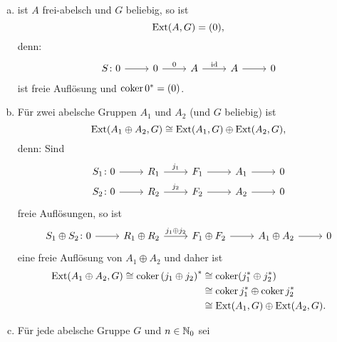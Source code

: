 \begin{beispiel}
  \begin{enumerate}[(a)]
    \item
      ist $A$ frei-abelsch und $G$ beliebig, so ist
      \begin{equation*}
        \mathrm{Ext}(A,G) = (0),
      \end{equation*}
      denn:
      \begin{equation*}
        \begin{tikzcd}
          S\colon 0 \arrow{r}{}  & 0 \arrow{r}{0}  & A \arrow{r}{\id}  & A \arrow{r}{} & 0
        \end{tikzcd}
      \end{equation*}
      ist freie Auflösung und $\operatorname{coker} 0^* = (0)$.
    \item
      Für zwei abelsche Gruppen $A_1$ und $A_2$ (und $G$ beliebig) ist
      \begin{equation*}
        \mathrm{Ext}(A_1 \oplus A_2,G) \cong \mathrm{Ext}(A_1,G) \oplus \mathrm{Ext}(A_2,G),
      \end{equation*}
      denn: Sind
      \begin{equation*}
        \begin{tikzcd}[row sep=tiny]
          S_1\colon 0 \arrow{r}{}  & R_1 \arrow{r}{j_1}  & F_1 \arrow{r}{}  & A_1 \arrow{r}{} & 0 \\
          S_2\colon 0 \arrow{r}{}  & R_2 \arrow{r}{j_2}  & F_2 \arrow{r}{}  & A_2 \arrow{r}{} & 0
        \end{tikzcd}
      \end{equation*}
      freie Auflösungen, so ist
      \begin{equation*}
        \begin{tikzcd}[row sep=tiny]
          S_1 \oplus S_2\colon 0 \arrow{r}{}  & R_1 \oplus R_2 \arrow{r}{j_1 \oplus j_2}  & F_1 \oplus F_2 \arrow{r}{}  & A_1 \oplus A_2 \arrow{r}{} & 0
        \end{tikzcd}
      \end{equation*}
      eine freie Auflösung von $A_1 \oplus A_2$ und daher ist
      \begin{align*}
        \mathrm{Ext}(A_1 \oplus A_2,G) \cong \operatorname{coker} {(j_1 \oplus j_2)}^*
          & \cong \operatorname{coker} (j_1^* \oplus j_2^*) \\
          & \cong \operatorname{coker} j_1^* \oplus \operatorname{coker} j_2^* \\
          & \cong \mathrm{Ext}(A_1,G) \oplus \mathrm{Ext}(A_2,G).
      \end{align*}
    \item
      Für jede abelsche Gruppe $G$ und $n \in \mathbb{N}_0$ sei

\end{enumerate}
\end{beispiel}
